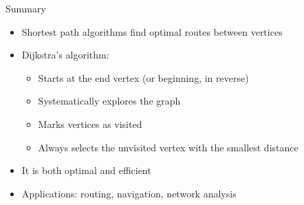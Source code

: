 \documentclass{beamer}
\begin{document}
\begin{frame}{Summary}
\begin{itemize}
\item Shortest path algorithms find optimal routes between vertices
\item Dijkstra's algorithm:
  \begin{itemize}
  \item Starts at the end vertex (or beginning, in reverse)
  \item Systematically explores the graph
  \item Marks vertices as visited
  \item Always selects the unvisited vertex with the smallest distance
  \end{itemize}
\item It is both optimal and efficient
\item Applications: routing, navigation, network analysis
\end{itemize}
\end{frame}
\end{document}
